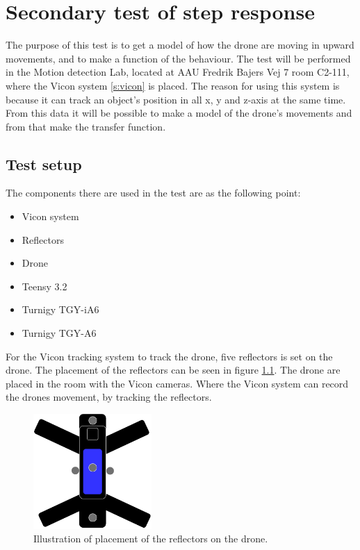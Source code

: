 \chapter{Secondary test of step response}\label{ap:drone_secondary_test}
The purpose of this test is to get a model of how the drone are moving in upward movements, and to make a function of the behaviour. The test will be performed in the Motion detection Lab, located at AAU Fredrik Bajers Vej 7 room C2-111, where the Vicon system \ref{s:vicon} is placed. The reason for using this system is because it can track an object's position in all x, y and z-axis at the same time. From this data it will be possible to make a model of the drone's movements and from that make the transfer function.

\section*{Test setup}
The components there are used in the test are as the following point:
\begin{itemize}
    \item{Vicon system}
    \item{Reflectors}
    \item{Drone}
    \item{Teensy 3.2} %
    \item{Turnigy TGY-iA6} %
    \item{Turnigy TGY-A6} %
\end{itemize}
For the Vicon tracking system to track the drone, five reflectors is set on the drone. The placement of the reflectors can be seen in figure \ref{fig:reflectors_secondary}.
The drone are placed in the room with the Vicon cameras. Where the Vicon system can record the drones movement, by tracking the reflectors. 

\begin{figure}[H]
    \centering
    \includegraphics[width=0.4\textwidth]{figures/Appendix/measuringTest/Reflector1.pdf}
    \caption{Illustration of placement of the reflectors on the drone.}
    \label{fig:reflectors_secondary}
\end{figure}

